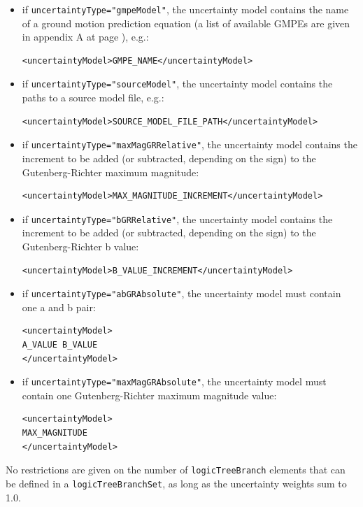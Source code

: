 \begin{itemize}
\item if \Verb+uncertaintyType="gmpeModel"+, the uncertainty model 
contains the name of a ground motion prediction equation (a list of 
available GMPEs are given in appendix A at page 
\pageref{sec:gmpes_list}), e.g.:
\begin{Verbatim}[frame=single, commandchars=\\\{\}]
<uncertaintyModel>GMPE_NAME</uncertaintyModel>
\end{Verbatim}
\item if \Verb+uncertaintyType="sourceModel"+, the uncertainty model contains 
the paths to a source model file, e.g.:
\begin{Verbatim}[frame=single, commandchars=\\\{\}]
<uncertaintyModel>SOURCE_MODEL_FILE_PATH</uncertaintyModel>
\end{Verbatim}
\item if \Verb+uncertaintyType="maxMagGRRelative"+, the uncertainty model 
contains the increment to be added (or subtracted, depending on the sign) 
to the Guten\-berg-Richter maximum magnitude:
\begin{Verbatim}[frame=single, commandchars=\\\{\}, samepage=true]
<uncertaintyModel>MAX_MAGNITUDE_INCREMENT</uncertaintyModel>
\end{Verbatim}
\item if \Verb+uncertaintyType="bGRRelative"+, the uncertainty model 
contains the increment to be added (or subtracted, depending on the 
sign) to the Guten\-berg-Richter b value:
\begin{Verbatim}[frame=single, commandchars=\\\{\}, samepage=true]
<uncertaintyModel>B_VALUE_INCREMENT</uncertaintyModel>
\end{Verbatim}
\item if \Verb+uncertaintyType="abGRAbsolute"+, the uncertainty model 
must contain one a and b pair:
\begin{Verbatim}[frame=single, commandchars=\\\{\}, samepage=true]
<uncertaintyModel>
A_VALUE B_VALUE
</uncertaintyModel>
\end{Verbatim}
    \item if \Verb+uncertaintyType="maxMagGRAbsolute"+, the uncertainty 
    model must contain one Guten\-berg-Richter maximum 
    magnitude value:
%
\begin{Verbatim}[frame=single, commandchars=\\\{\}, samepage=true]
<uncertaintyModel>
MAX_MAGNITUDE
</uncertaintyModel>
\end{Verbatim}
\end{itemize}
%
No restrictions are given on the number of \Verb+logicTreeBranch+ elements 
that can be defined in a \Verb+logicTreeBranchSet+, as long as the uncertainty 
weights sum to 1.0.

